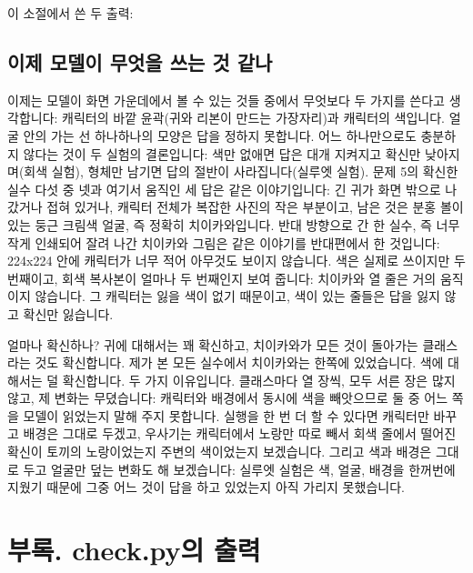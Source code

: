 \documentclass[11pt]{article}
\begin{document}
이 소절에서 쓴 두 출력:



\subsection*{이제 모델이 무엇을 쓰는 것 같나}

이제는 모델이 화면 가운데에서 볼 수 있는 것들 중에서 무엇보다 두 가지를 쓴다고
생각합니다: 캐릭터의 바깥 윤곽(귀와 리본이 만드는 가장자리)과 캐릭터의 색입니다.
얼굴 안의 가는 선 하나하나의 모양은 답을 정하지 못합니다. 어느 하나만으로도
충분하지 않다는 것이 두 실험의 결론입니다: 색만 없애면 답은 대개 지켜지고 확신만
낮아지며(회색 실험), 형체만 남기면 답의 절반이 사라집니다(실루엣 실험). 문제 5의
확신한 실수 다섯 중 넷과 여기서 움직인 세 답은 같은 이야기입니다: 긴 귀가 화면 밖으로
나갔거나 접혀 있거나, 캐릭터 전체가 복잡한 사진의 작은 부분이고, 남은 것은
분홍 볼이 있는 둥근 크림색 얼굴, 즉 정확히 치이카와입니다. 반대 방향으로 간 한
실수, 즉 너무 작게 인쇄되어 잘려 나간 치이카와 그림은 같은 이야기를 반대편에서
한 것입니다: 224x224 안에 캐릭터가 너무 적어 아무것도 보이지 않습니다. 색은
실제로 쓰이지만 두 번째이고, 회색 복사본이 얼마나 두 번째인지 보여 줍니다:
치이카와 열 줄은 거의 움직이지 않습니다. 그 캐릭터는 잃을 색이 없기 때문이고,
색이 있는 줄들은 답을 잃지 않고 확신만 잃습니다.

얼마나 확신하나? 귀에 대해서는 꽤 확신하고, 치이카와가 모든 것이 돌아가는
클래스라는 것도 확신합니다. 제가 본 모든 실수에서 치이카와는 한쪽에
있었습니다. 색에 대해서는 덜 확신합니다. 두 가지 이유입니다. 클래스마다 열
장씩, 모두 서른 장은 많지 않고, 제 변화는 무뎠습니다: 캐릭터와 배경에서 동시에 색을
빼앗으므로 둘 중 어느 쪽을 모델이 읽었는지 말해 주지 못합니다. 실행을 한 번 더
할 수 있다면 캐릭터만 바꾸고 배경은 그대로 두겠고, 우사기는 캐릭터에서 노랑만
따로 빼서 회색 줄에서 떨어진 확신이 토끼의 노랑이었는지 주변의 색이었는지
보겠습니다. 그리고 색과 배경은 그대로 두고 얼굴만 덮는 변화도 해 보겠습니다:
실루엣 실험은 색, 얼굴, 배경을 한꺼번에 지웠기 때문에 그중 어느 것이 답을 하고
있었는지 아직 가리지 못했습니다.

\section*{부록. check.py의 출력}
\end{document}
